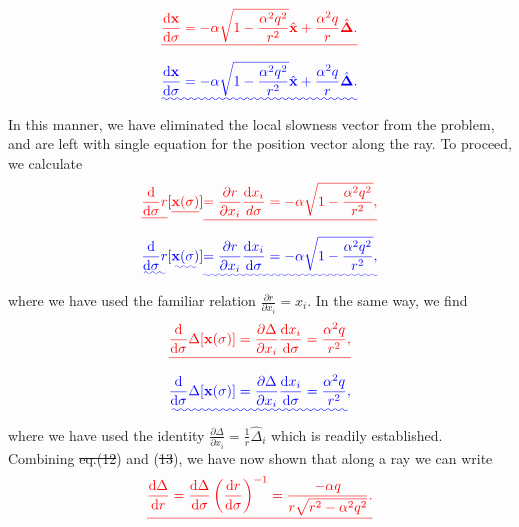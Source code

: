 \documentclass [a4paper,12pt]{paper}
\providecommand{\DIFadd}[1]{{\protect\color{blue}\uwave{#1}}} %
\providecommand{\DIFdel}[1]{{\protect\color{red}\sout{#1}}}                      %
\providecommand{\DIFaddbegin}{} %
\providecommand{\DIFaddend}{} %
\providecommand{\DIFdelbegin}{} %
\providecommand{\DIFdelend}{} %
\begin{document}
\DIFdelbegin \begin{displaymath}
\DIFdel{\frac{\ddns \mathbf{x}}{\ddns \sigma}=-\alpha\sqrt{1-\frac{\alpha^{2}q^{2}}{r^{2}}}\hat{\mathbf{x}}+\frac{\alpha^{2}q}{r}\hat{\bm{\Delta}} .
}\end{displaymath}%
\DIFdelend \DIFaddbegin \begin{equation}
\DIFadd{\frac{\ddns \mathbf{x}}{\ddns \sigma}=-\alpha\sqrt{1-\frac{\alpha^{2}q^{2}}{r^{2}}}\hat{\mathbf{x}}+\frac{\alpha^{2}q}{r}\hat{\bm{\Delta}}.
\label{eq:11}
}\end{equation}\DIFaddend 
In this manner, we have eliminated the local slowness vector from the problem, and are left with \DIFaddbegin \DIFadd{a }\DIFaddend single equation for the position vector along the ray. To proceed, we calculate
\DIFdelbegin \begin{displaymath}
\DIFdel{\frac{\ddns }{\ddns \sigma}r}[\DIFdel{\mathbf{x}(\sigma)}]\DIFdel{=\frac{\partial r}{\partial x_{i}}\frac{\ddns x_{i}}{d\sigma}=-\alpha\sqrt{1-\frac{\alpha^{2}q^{2}}{r^{2}}},
}\end{displaymath}%
\DIFdelend \DIFaddbegin \begin{equation}
\DIFadd{\frac{\ddns }{\ddns \sigma}r}[\DIFadd{\mathbf{x}(\sigma)}]\DIFadd{=\frac{\partial r}{\partial x_{i}}\frac{\ddns x_{i}}{\ddns\sigma}=-\alpha\sqrt{1-\frac{\alpha^{2}q^{2}}{r^{2}}},
\label{eq:12}
}\end{equation}\DIFaddend 
where we have used the familiar relation $\frac{\partial r}{\partial x_{i}}=\hat{x}_{i}$. In the same way, we find
\DIFdelbegin \begin{displaymath}
\DIFdel{\frac{\ddns }{\ddns \sigma}\Delta[\mathbf{x}(\sigma)]=\frac{\partial\Delta}{\partial x_{i}}\frac{\ddns x_{i}}{\ddns \sigma}=\frac{\alpha^{2}q}{r^{2}},
}\end{displaymath}%
\DIFdelend \DIFaddbegin \begin{equation}
\DIFadd{\frac{\ddns }{\ddns \sigma}\Delta[\mathbf{x}(\sigma)]=\frac{\partial\Delta}{\partial x_{i}}\frac{\ddns x_{i}}{\ddns \sigma}=\frac{\alpha^{2}q}{r^{2}},
\label{eq:13}
}\end{equation}\DIFaddend 
where we have used the identity $\frac{\partial\Delta}{\partial x_{i}}=\frac{1}{r}\hat{\Delta}_{i}$ which is readily established. Combining \DIFdelbegin \DIFdel{eq.(12}\DIFdelend \DIFaddbegin \DIFadd{eqs.~(\ref{eq:12}}\DIFaddend ) and (\DIFdelbegin \DIFdel{13}\DIFdelend \DIFaddbegin \DIFadd{\ref{eq:13}}\DIFaddend ), we have now shown that along a ray we can write
\DIFdelbegin \begin{displaymath}
\DIFdel{\frac{\ddns \Delta}{\ddns r}=\frac{\ddns \Delta}{\ddns\sigma}\left(\frac{\ddns r}{\ddns \sigma}\right)^{-1}=\frac{-\alpha q}{r\sqrt{r^{2}-\alpha^{2}q^{2}}}.
}\end{displaymath}%
\end{document}
